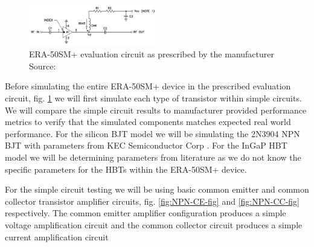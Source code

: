 \documentclass[conference]{IEEEtran}
\begin{document}
\begin{figure}[htbp]
    \centerline{\includegraphics[width=0.5\textwidth]{figures/era-test-circuit.png}}
    \caption{ERA-50SM+ evaluation circuit as prescribed by the manufacturer \\ Source: \cite{ERA-50SM+}}
    \label{fig:ERA-Test-circuit}
\end{figure}

Before simulating the entire ERA-50SM+ device in the prescribed evaluation circuit, fig. \ref{fig:ERA-Test-circuit} we will first
simulate each type of transistor within simple circuits. We will compare the simple circuit results to manufacturer provided
performance metrics to verify that the simulated components matches expected real world performance. For the silicon BJT model we will
be simulating the 2N3904 NPN BJT with parameters from KEC Semiconductor Corp \cite{3904}. For the InGaP HBT model we will be
determining parameters from literature \cite{Oka2001,Low1999} as we do not know the specific parameters for the HBTs within the
ERA-50SM+ device.

For the simple circuit testing we will be using basic common emitter and common collector transistor amplifier circuits,
fig. \ref{fig:NPN-CE-fig} and \ref{fig:NPN-CC-fig} respectively. The common emitter amplifier configuration produces a simple
voltage amplification circuit and the common collector circuit produces a simple current amplification circuit
\end{document}
